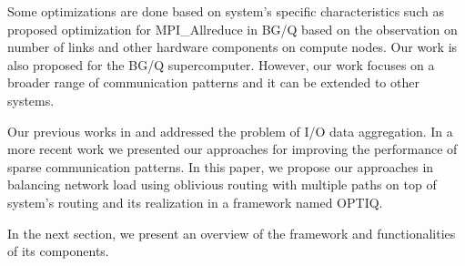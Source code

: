 Some optimizations are done based on system’s specific characteristics such as \cite{Kumar:Allreduce} proposed optimization for MPI\_Allreduce in BG/Q based on the observation on number of links and other hardware components on compute nodes. Our work is also proposed for the BG/Q supercomputer. However, our work focuses on a broader range of communication patterns and it can be extended to other systems.

Our previous works in \cite{Vishwanath:GLEAN} and \cite{SDAV:Bui2014b} addressed the problem of I/O data aggregation. In a more recent work \cite{hbui:bgq} we presented our approaches for improving the performance of sparse communication patterns. In this paper, we propose our approaches in balancing network load using oblivious routing with multiple paths on top of system's routing and its realization in a framework named OPTIQ. 

In the next section, we present an overview of the framework and functionalities of its components.
